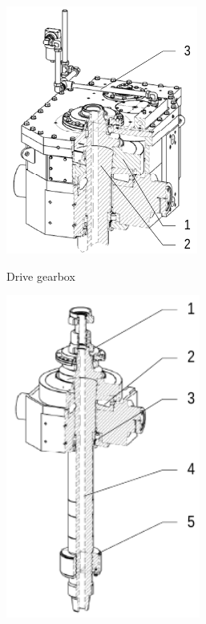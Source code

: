\begin{figure}[H]
	\centering
	\begin{subfigure}[t]{0.4\textwidth}
         \centering
	 \includegraphics[width=.7\textwidth]{figures/topdrive_drillingunit_drive_gearbox.png}
	 \label{fig:topdrive-drillingunit-drive-gearbox}
	 \caption{Drive gearbox}
     \end{subfigure}%
     \begin{subfigure}[t]{0.4\textwidth}
         \centering
 \includegraphics[width=0.7\textwidth]{figures/topdrive_drillingunit_drive_mainshaft.png}

\end{subfigure}
\end{figure}
